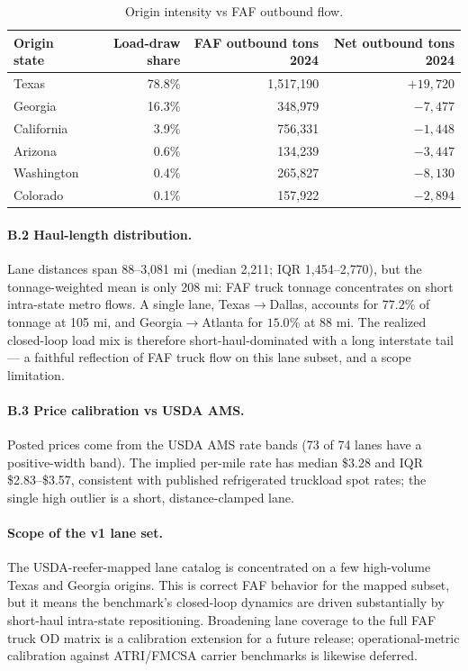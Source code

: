 \documentclass[11pt]{article}
\begin{document}
\begin{table}[t]
\centering
\caption{Origin intensity vs FAF outbound flow.}
\label{tab:calib-origin}
\small
\begin{tabular}{lrrr}
\toprule
Origin state & Load-draw share & FAF outbound tons 2024 & Net outbound tons 2024 \\
\midrule
Texas      & 78.8\% & 1{,}517{,}190 & $+19{,}720$ \\
Georgia    & 16.3\% &   348{,}979 & $-7{,}477$ \\
California &  3.9\% &   756{,}331 & $-1{,}448$ \\
Arizona    &  0.6\% &   134{,}239 & $-3{,}447$ \\
Washington &  0.4\% &   265{,}827 & $-8{,}130$ \\
Colorado   &  0.1\% &   157{,}922 & $-2{,}894$ \\
\bottomrule
\end{tabular}
\end{table}

\paragraph{B.2 Haul-length distribution.}
Lane distances span 88--3{,}081 mi (median 2{,}211; IQR 1{,}454--2{,}770),
but the tonnage-weighted mean is only 208 mi: FAF truck tonnage
concentrates on short intra-state metro flows. A single lane,
Texas$\to$Dallas, accounts for $77.2\%$ of tonnage at 105 mi, and
Georgia$\to$Atlanta for $15.0\%$ at 88 mi. The realized closed-loop load
mix is therefore short-haul-dominated with a long interstate tail --- a
faithful reflection of FAF truck flow on this lane subset, and a scope
limitation.

\paragraph{B.3 Price calibration vs USDA AMS.}
Posted prices come from the USDA AMS rate bands (73 of 74 lanes have a
positive-width band). The implied per-mile rate has median \$3.28 and IQR
\$2.83--\$3.57, consistent with published refrigerated truckload spot
rates; the single high outlier is a short, distance-clamped lane.

\paragraph{Scope of the v1 lane set.}
The USDA-reefer-mapped lane catalog is concentrated on a few high-volume
Texas and Georgia origins. This is correct FAF behavior for the mapped
subset, but it means the benchmark's closed-loop dynamics are driven
substantially by short-haul intra-state repositioning. Broadening lane
coverage to the full FAF truck OD matrix is a calibration extension for a
future release; operational-metric calibration against ATRI/FMCSA carrier
benchmarks is likewise deferred.



\end{document}
